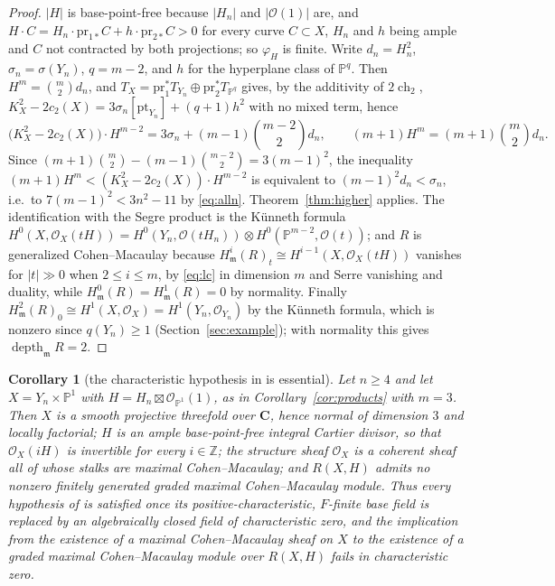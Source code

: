 \documentclass[11pt]{amsart}
\newtheorem{corollary}[theorem]{Corollary}
\theoremstyle{remark}
\theoremstyle{definition}
\newcommand{\PP}{\mathbb{P}}
\newcommand{\ZZ}{\mathbb{Z}}
\newcommand{\CC}{\mathbf{C}}
\newcommand{\cO}{\mathcal{O}}
\DeclareMathOperator{\depth}{depth}
\begin{document}
\begin{proof}
$|H|$ is base-point-free because $|H_n|$ and $|\cO(1)|$ are, and $H\cdot C=H_n\cdot\mathrm{pr}_{1*}C+h\cdot\mathrm{pr}_{2*}C>0$ for every curve $C\subset X$, $H_n$ and $h$ being ample and $C$ not contracted by both projections; so $\varphi_H$ is finite. Write $d_n=H_n^2$, $\sigma_n=\sigma(Y_n)$, $q=m-2$, and $h$ for the hyperplane class of $\PP^q$. Then $H^m=\binom m2d_n$, and $T_X=\mathrm{pr}_1^*T_{Y_n}\oplus\mathrm{pr}_2^*T_{\PP^q}$ gives, by the additivity of $2\operatorname{ch}_2$, $K_X^2-2c_2(X)=3\sigma_n[\mathrm{pt}_{Y_n}]+(q+1)h^2$ with no mixed term, hence
\[
\bigl(K_X^2-2c_2(X)\bigr)\cdot H^{m-2}=3\sigma_n+(m-1)\binom{m-2}2d_n ,\qquad (m+1)H^m=(m+1)\binom m2d_n .
\]
Since $(m+1)\binom m2-(m-1)\binom{m-2}2=3(m-1)^2$, the inequality $(m+1)H^m<(K_X^2-2c_2(X))\cdot H^{m-2}$ is equivalent to $(m-1)^2d_n<\sigma_n$, i.e.\ to $7(m-1)^2<3n^2-11$ by \eqref{eq:alln}. Theorem~\ref{thm:higher} applies. The identification with the Segre product is the K\"unneth formula $H^0(X,\cO_X(tH))=H^0(Y_n,\cO(tH_n))\otimes H^0(\PP^{m-2},\cO(t))$; and $R$ is generalized Cohen--Macaulay because $H^i_{\mathfrak m}(R)_t\cong H^{i-1}(X,\cO_X(tH))$ vanishes for $|t|\gg0$ when $2\le i\le m$, by \eqref{eq:lc} in dimension $m$ and Serre vanishing and duality, while $H^0_{\mathfrak m}(R)=H^1_{\mathfrak m}(R)=0$ by normality. Finally $H^2_{\mathfrak m}(R)_0\cong H^1(X,\cO_X)=H^1(Y_n,\cO_{Y_n})$ by the K\"unneth formula, which is nonzero since $q(Y_n)\ge1$ (Section~\ref{sec:example}); with normality this gives $\depth_{\mathfrak m}R=2$.
\end{proof}

\begin{corollary}[the characteristic hypothesis in \cite{ShTa} is essential]\label{cor:shta}
Let $n\ge4$ and let $X=Y_n\times\PP^1$ with $H=H_n\boxtimes\cO_{\PP^1}(1)$, as in Corollary~\ref{cor:products} with $m=3$. Then $X$ is a smooth projective threefold over $\CC$, hence normal of dimension $3$ and locally factorial; $H$ is an ample base-point-free integral Cartier divisor, so that $\cO_X(iH)$ is invertible for every $i\in\ZZ$; the structure sheaf $\cO_X$ is a coherent sheaf all of whose stalks are maximal Cohen--Macaulay; and $R(X,H)$ admits no nonzero finitely generated graded maximal Cohen--Macaulay module. Thus every hypothesis of \textup{\cite[Cor.~4.5(i)]{ShTa}} is satisfied once its positive-characteristic, $F$-finite base field is replaced by an algebraically closed field of characteristic zero, and the implication from the existence of a maximal Cohen--Macaulay sheaf on $X$ to the existence of a graded maximal Cohen--Macaulay module over $R(X,H)$ fails in characteristic zero.
\end{corollary}
\end{document}
